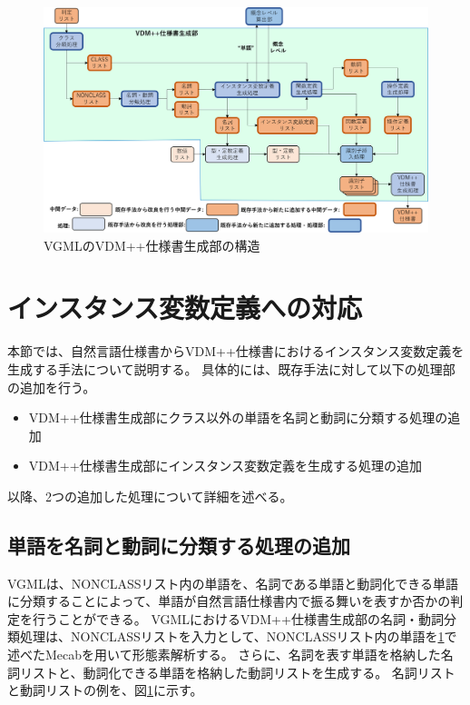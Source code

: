 \begin{figure}[t]
    \begin{center}
        \includegraphics[width=1.0\columnwidth]{image/vgml_generator.png}
        \caption{VGMLのVDM++仕様書生成部の構造}
        \label{fig:vgml_generator}
    \end{center}
\end{figure}

\section{インスタンス変数定義への対応}
本節では、自然言語仕様書からVDM++仕様書におけるインスタンス変数定義を生成する手法について説明する。
具体的には、既存手法に対して以下の処理部の追加を行う。

\begin{itemize}
    \item VDM++仕様書生成部にクラス以外の単語を名詞と動詞に分類する処理の追加
    \item VDM++仕様書生成部にインスタンス変数定義を生成する処理の追加
\end{itemize}

以降、2つの追加した処理について詳細を述べる。

\subsection{単語を名詞と動詞に分類する処理の追加}
\label{sec:classifier_meishi}
VGMLは、NONCLASSリスト内の単語を、名詞である単語と動詞化できる単語に分類することによって、単語が自然言語仕様書内で振る舞いを表すか否かの判定を行うことができる。
VGMLにおけるVDM++仕様書生成部の名詞・動詞分類処理は、NONCLASSリストを入力として、NONCLASSリスト内の単語を\ref{}で述べたMecabを用いて形態素解析する。
さらに、名詞を表す単語を格納した名詞リストと、動詞化できる単語を格納した動詞リストを生成する。
名詞リストと動詞リストの例を、図\ref{}に示す。

